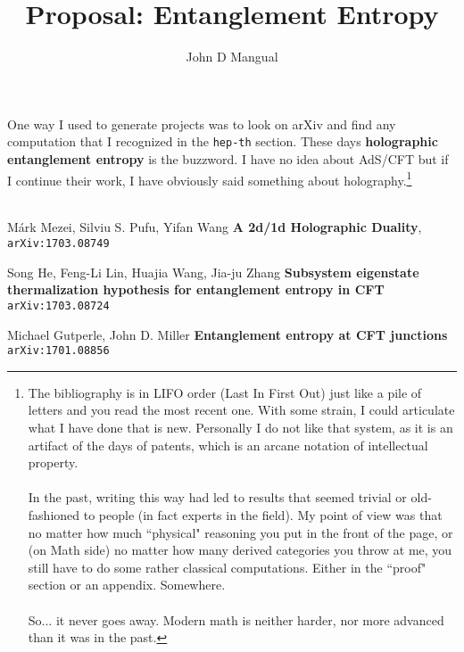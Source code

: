 \documentclass[12pt]{article}
\title{\textbf{Proposal: Entanglement Entropy}}
\author{John D Mangual}
\date{}
\begin{document}
\selectfont \fontsize{15}{20}\selectfont

\maketitle

\noindent One way I used to generate projects was to look on arXiv and find any computation that I recognized in the \texttt{hep-th} section.  These days \textbf{holographic entanglement entropy} is the buzzword.  I have no idea about AdS/CFT but if I continue their work, I have obviously said something about holography.\footnote{The bibliography is in LIFO order (Last In First Out) just like a pile of letters and you read the most recent one.  With some strain, I could articulate what I have done that is new.  Personally I do not like that system, as it is an artifact of the days of patents, which is an arcane notation of intellectual property.\\ \\ In the past, writing this way had led to results that seemed trivial or old-fashioned to people (in fact experts in the field).  My point of view was that no matter how much ``physical" reasoning you put in the front of the page, or (on Math side) no matter how many derived categories you throw at me, you still have to do some rather classical computations.  Either in the ``proof" section or an appendix.  Somewhere.  \\ \\ So... it never goes away.  Modern math is neither harder, nor more advanced than it was in the past.} \\ \\


\vfill

\selectfont \fontsize{10}{15}\selectfont

\begin{thebibliography}{}

\item M\'{a}rk Mezei, Silviu S. Pufu, Yifan Wang
 \textbf{A 2d/1d Holographic Duality}, \texttt{ arXiv:1703.08749}

\item Song He, Feng-Li Lin, Huajia Wang, Jia-ju Zhang \textbf{Subsystem eigenstate thermalization hypothesis for entanglement entropy in CFT} \texttt{arXiv:1703.08724}

\item Michael Gutperle, John D. Miller \textbf{Entanglement entropy at CFT junctions} \texttt{arXiv:1701.08856}

\end{thebibliography}
\end{document}
